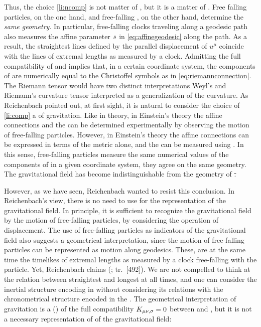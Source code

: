 \documentclass[submitted]{article}
\newcommand{\til}{timelike\xspace}
\renewcommand{\rzlap}[2]{(\cite[#1]{Reichenbach1928}; tr.\ [#2])\xspace}
\begin{document}

Thus, the choice \cref{li:ncomp} is not matter of , but it is a matter of  . Free falling particles, on the one hand, and free-falling \rac, on the other hand, determine the \emph{same geometry}. In particular, free-falling clocks traveling along a geodesic path also measures the affine parameter $s$ in \cref{eq:affinegeodesic} along the path. As a result, the straightest lines defined by the parallel displacement of $u^\mu$ coincide with the lines of extremal lengths as measured by a clock. Admitting the full compatibility of \gmn and \Gtmn implies that, in a certain coordinate system, the components of \Gtmn are numerically equal to the Christoffel symbols as in \cref{eq:riemannconnection}. The Riemann tensor would have two distinct interpretations Weyl's  \ritea and Riemann's curvature tensor \riteg interpreted as a generalization of the  curvature. As Reichenbach pointed out, at first sight, it is natural to consider the choice of \cref{li:comp} a  of gravitation. Like in  theory, in Einstein's theory the affine connections and the \ritea can be determined experimentally by observing the motion of free-falling particles. However, in Einstein's theory the affine connections \Gtmn can be expressed in terms of the metric \gmn alone, and the \riteg can be measured using \rac. In this sense, free-falling particles measure the same numerical values of the components of \rite in a given coordinate system, \ie they agree on the same geometry. The gravitational field has become indistinguishable from the geometry of \st.

However, as we have seen, Reichenbach wanted to resist this conclusion. In Reichenbach's view, there is no need to use \rac for the representation of the gravitational field. In principle, it is sufficient to recognize the gravitational field by the motion of free-falling particles, by considering the operation of displacement. The use of free-falling particles as indicators of the gravitational field also suggests a geometrical interpretation, since the motion of free-falling particles can be represented as motion along geodesics. These, are at the same time the \til \wl{}s of extremal lengths as measured by a clock free-falling with the particle. Yet, Reichenbach claims  \rzlap{353}{492}. We are not compelled to think at the relation between straightest and longest \wl{} at all times, and one can consider the inertial structure encoding in \Gtmn without considering its relations with the chronometrical structure encoded in the \gmn. The geometrical interpretation of gravitation is a  () of the full compatibility $K_{\mu \nu, \sigma}=0$ between \gmn and \Gtmn, but it is not a necessary representation of of the gravitational field:
\end{document}
